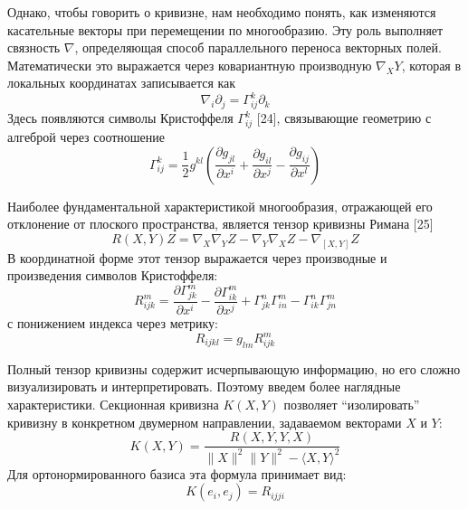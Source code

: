 \documentclass[a4paper,12pt]{extarticle}
\begin{document}
Однако, чтобы говорить о кривизне, нам необходимо понять, как изменяются касательные векторы при перемещении по многообразию. Эту роль выполняет связность $\nabla$, определяющая способ параллельного переноса векторных полей. Математически это выражается через ковариантную производную $\nabla_X Y$, которая в локальных координатах записывается как \begin{equation}\nabla_i \partial_j = \Gamma^k_{ij} \partial_k\end{equation} Здесь появляются символы Кристоффеля $\Gamma^k_{ij}$ [24], связывающие геометрию с алгеброй через соотношение \begin{equation}\Gamma^k_{ij} = \frac{1}{2} g^{kl} \left( \frac{\partial g_{jl}}{\partial x^i} + \frac{\partial g_{il}}{\partial x^j} - \frac{\partial g_{ij}}{\partial x^l} \right)\end{equation}

Наиболее фундаментальной характеристикой многообразия, отражающей его отклонение от плоского пространства, является тензор кривизны Римана [25] \begin{equation}R(X, Y)Z = \nabla_X \nabla_Y Z - \nabla_Y \nabla_X Z - \nabla_{[X, Y]} Z\end{equation} В координатной форме этот тензор выражается через производные и произведения символов Кристоффеля: \begin{equation}R^m_{ijk} = \frac{\partial \Gamma^m_{jk}}{\partial x^i} - \frac{\partial \Gamma^m_{ik}}{\partial x^j} + \Gamma^n_{jk}\Gamma^m_{in} - \Gamma^n_{ik}\Gamma^m_{jn}\end{equation} с понижением индекса через метрику: \begin{equation}R_{ijkl} = g_{lm} R^m_{ijk}\end{equation}

Полный тензор кривизны содержит исчерпывающую информацию, но его сложно визуализировать и интерпретировать. Поэтому введем более наглядные характеристики. Секционная кривизна $K(X,Y)$ позволяет ``изолировать'' кривизну в конкретном двумерном направлении, задаваемом векторами $X$ и $Y$: \begin{equation}K(X,Y) = \frac{R(X,Y,Y,X)}{\|X\|^2\|Y\|^2 - \langle X,Y \rangle^2}\end{equation} Для ортонормированного базиса эта формула принимает вид: \begin{equation}K(e_i, e_j) = R_{ijji}\end{equation}
\end{document}
